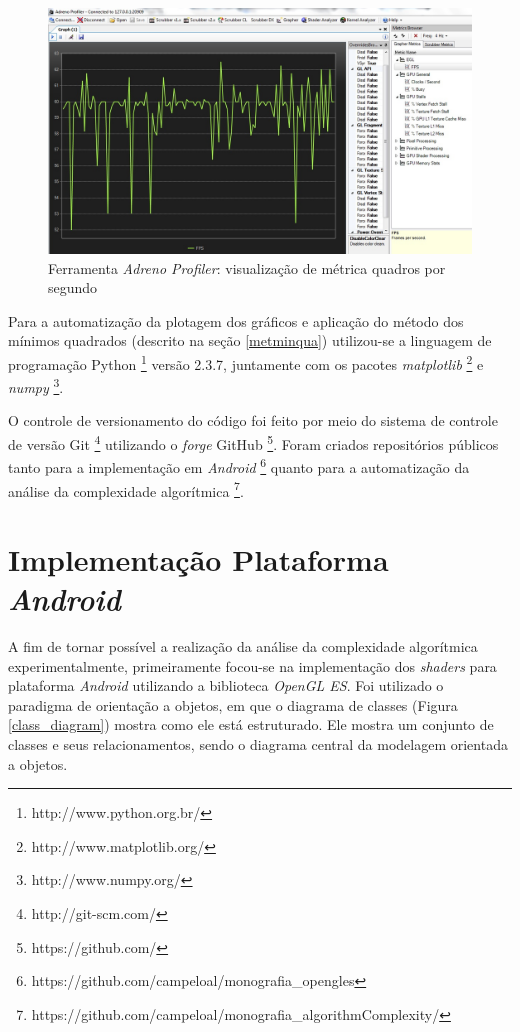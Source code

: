 	\begin{figure}[h]
	\centering
		\includegraphics[keepaspectratio=true,scale=0.35]{figuras/graph.jpg}
	\caption{Ferramenta \textit{Adreno Profiler}: visualização de métrica quadros por segundo}
	\label{graph}
	\end{figure}

	Para a automatização da plotagem dos gráficos e aplicação do método dos mínimos quadrados (descrito na seção \ref{metminqua}) utilizou-se a linguagem de programação Python \footnote{http://www.python.org.br/} versão 2.3.7, juntamente com os pacotes  \textit{matplotlib} \footnote{http://www.matplotlib.org/} e  \textit{numpy} \footnote{http://www.numpy.org/}. 

	O controle de versionamento do código foi feito por meio do sistema de controle de versão Git \footnote{http://git-scm.com/} utilizando o \textit{forge} GitHub \footnote{https://github.com/}. Foram criados repositórios públicos tanto para a implementação em \textit{Android} \footnote{https://github.com/campeloal/monografia\_opengles} quanto para a automatização da análise da complexidade algorítmica \footnote{https://github.com/campeloal/monografia\_algorithmComplexity/}. 

\section{Implementação Plataforma \textit{Android}} 
\label{imp}

	 A fim de tornar possível a realização da análise da complexidade algorítmica experimentalmente, primeiramente focou-se na implementação dos \textit{shaders} para plataforma \textit{Android} utilizando a biblioteca \textit{OpenGL ES}. Foi utilizado  o paradigma de orientação a objetos, em que o diagrama de classes (Figura \ref{class_diagram}) mostra como ele está estruturado. Ele mostra um conjunto de classes e seus relacionamentos, sendo o diagrama central da modelagem orientada a objetos. 

